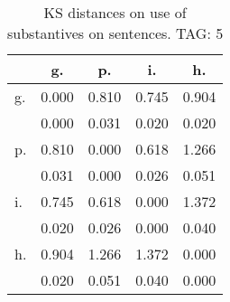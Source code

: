 \begin{table}[h!]
\begin{center}
\begin{tabular}{| l | c | c | c | c |}\hline
 & g. & p. & i. & h. \\\hline
g. & 0.000  & 0.810  & 0.745  & 0.904 \\\hline
 & 0.000  & 0.031  & 0.020  & 0.020 \\\hline
p. & 0.810  & 0.000  & 0.618  & 1.266 \\\hline
 & 0.031  & 0.000  & 0.026  & 0.051 \\\hline
i. & 0.745  & 0.618  & 0.000  & 1.372 \\\hline
 & 0.020  & 0.026  & 0.000  & 0.040 \\\hline
h. & 0.904  & 1.266  & 1.372  & 0.000 \\\hline
 & 0.020  & 0.051  & 0.040  & 0.000 \\\hline
\end{tabular}
\caption{KS distances on use of substantives on sentences. TAG: 5}
\end{center}
\end{table}